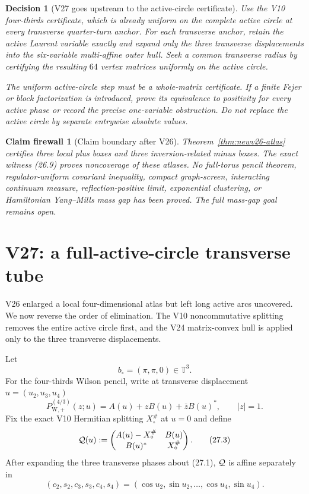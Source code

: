 \documentclass[11pt,oneside]{article}
\newtheorem{firewall}[theorem]{Claim firewall}
\newtheorem{decision}[theorem]{Decision}
\theoremstyle{definition}
\theoremstyle{remark}
\begin{document}
\begin{decision}[V27 goes upstream to the active-circle certificate]
\label{dec:newv26-next}
Use the V10 four-thirds certificate, which is already uniform on the
complete active circle at every transverse quarter-turn anchor.
For each transverse anchor, retain the active Laurent variable
exactly and expand only the three transverse displacements into the
six-variable multi-affine outer hull.  Seek a common transverse
radius by certifying the resulting \(64\) vertex matrices uniformly
on the active circle.

The uniform active-circle step must be a whole-matrix certificate.
If a finite Fejer or block factorization is introduced, prove its
equivalence to positivity for every active phase or record the
precise one-variable obstruction.  Do not replace the active circle
by separate entrywise absolute values.
\end{decision}

\begin{firewall}[Claim boundary after V26]
\label{fire:newv26-final}
Theorem~\ref{thm:newv26-atlas} certifies three local plus boxes and
three inversion-related minus boxes.  The exact witness (26.9)
proves noncoverage of these atlases.  No full-torus pencil theorem,
regulator-uniform covariant inequality, compact graph-screen,
interacting continuum measure, reflection-positive limit,
exponential clustering, or Hamiltonian Yang--Mills mass gap has
been proved.  The full mass-gap goal remains open.
\end{firewall}

\section{V27: a full-active-circle transverse tube}
\label{sec:newv27-circle-tube}

V26 enlarged a local four-dimensional atlas but left long active
arcs uncovered.  We now reverse the order of elimination.  The V10
noncommutative splitting removes the entire active circle first, and
the V24 matrix-convex hull is applied only to the three transverse
displacements.

Let
\[
 b_\circ=(\pi,\pi,0)\in\mathbb T^3.                      \tag{27.1}
\]
For the four-thirds Wilson pencil, write at transverse displacement
\(u=(u_2,u_3,u_4)\)
\[
 P_{\mathrm W,+}^{(4/3)}(z;u)
 =A(u)+zB(u)+\bar zB(u)^*,\qquad |z|=1.                 \tag{27.2}
\]
Fix the exact V10 Hermitian splitting \(X_\circ^\#\) at \(u=0\)
and define
\[
 {\cal Q}(u):=
 \begin{pmatrix}
 A(u)-X_\circ^\#&B(u)\\
 B(u)^*&X_\circ^\#
 \end{pmatrix}.                                         \tag{27.3}
\]
After expanding the three transverse phases about (27.1),
\({\cal Q}\) is affine separately in
\[
 (c_2,s_2,c_3,s_3,c_4,s_4)
 =(\cos u_2,\sin u_2,\ldots,\cos u_4,\sin u_4).          \tag{27.4}
\]
\end{document}
